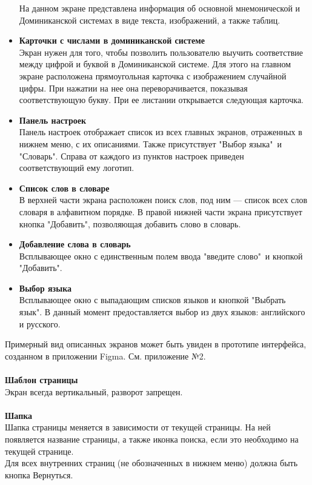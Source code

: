 \documentclass[draft]{article}
\begin{document}
\begin{itemize}
На данном экране представлена информация об основной мнемонической и Доминиканской системах в виде текста, изображений, а также таблиц.
\item \textbf{Карточки с числами в доминиканской системе}\\
Экран нужен для того, чтобы позволить пользователю выучить соответствие между цифрой и буквой в Доминиканской системе. Для этого на главном экране расположена прямоугольная карточка с изображением случайной цифры. При нажатии на нее она переворачивается, показывая соответствующую букву. При ее листании открывается следующая карточка.
\item \textbf{Панель настроек}\\
Панель настроек отображает список из всех главных экранов, отраженных в нижнем меню, с их описаниями. Также присутствует "{}Выбор языка"{}\ и "{}Словарь"{}. Справа от каждого из пунктов настроек приведен соответствующий ему логотип.
\item \textbf{Список слов в словаре}\\
В верхней части экрана расположен поиск слов, под ним — список всех слов словаря в алфавитном порядке. В правой нижней части экрана присутствует кнопка "{}Добавить"{}, позволяющая добавить слово в словарь.
\item \textbf{Добавление слова в словарь}\\
Всплывающее окно с единственным полем ввода "{}введите слово"{}\ и кнопкой "{}Добавить"{}.
\item \textbf{Выбор языка}\\
Всплывающее окно с выпадающим списков языков и кнопкой "{}Выбрать язык"{}. В данный момент предоставляется выбор из двух языков: английского и русского.
\end{itemize}
Примерный вид описанных экранов может быть увиден в прототипе интерфейса, созданном в приложении Figma. См. приложение №2.\\
~\\
\textbf{Шаблон страницы}\\
Экран всегда вертикальный, разворот запрещен.\\
~\\
\textbf{Шапка}\\
Шапка страницы меняется в зависимости от текущей страницы. На ней появляется название страницы, а также иконка поиска, если это необходимо на текущей странице.\\
Для всех внутренних страниц (не обозначенных в нижнем меню) должна быть кнопка
Вернуться.\\
\end{document}
